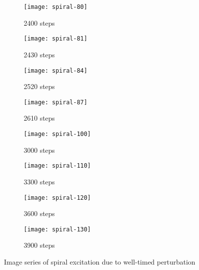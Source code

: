 \begin{figure}[h]
    \centering
    \begin{subfigure}[b]{.45\textwidth}
        \texttt{[image: spiral-80]}
        \vspace{-\baselineskip}
        \caption{2400 steps}
    \end{subfigure}
    \begin{subfigure}[b]{.45\textwidth}
        \texttt{[image: spiral-81]}
        \vspace{-\baselineskip}
        \caption{2430 steps}
    \end{subfigure}
    \begin{subfigure}[b]{.45\textwidth}
        \texttt{[image: spiral-84]}
        \vspace{-\baselineskip}
        \caption{2520 steps}
    \end{subfigure}
    \begin{subfigure}[b]{.45\textwidth}
        \texttt{[image: spiral-87]}
        \vspace{-\baselineskip}
        \caption{2610 steps}
    \end{subfigure}
    \begin{subfigure}[b]{.45\textwidth}
        \texttt{[image: spiral-100]}
        \vspace{-\baselineskip}
        \caption{3000 steps}
    \end{subfigure}
    \begin{subfigure}[b]{.45\textwidth}
        \texttt{[image: spiral-110]}
        \vspace{-\baselineskip}
        \caption{3300 steps}
    \end{subfigure}
    \begin{subfigure}[b]{.45\textwidth}
        \texttt{[image: spiral-120]}
        \vspace{-\baselineskip}
        \caption{3600 steps}
    \end{subfigure}
    \begin{subfigure}[b]{.45\textwidth}
        \texttt{[image: spiral-130]}
        \vspace{-\baselineskip}
        \caption{3900 steps}
    \end{subfigure}
    \label{fig:spiral}
    \caption{Image series of spiral excitation due to well-timed perturbation}
\end{figure}

